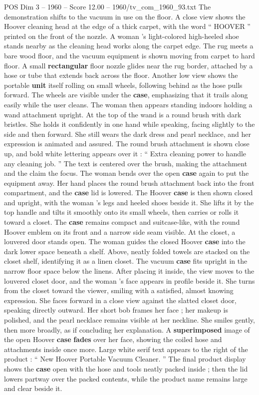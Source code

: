 \begin{textsample}{POS Dim 3 – 1960 – Score 12.00 – 1960/tv\_com\_1960\_93.txt}
The demonstration shifts to the vacuum in use on the floor.
A close view shows the Hoover cleaning head at the edge of a thick carpet, with the word “ HOOVER ” printed on the front of the nozzle.
A woman ’s light-colored high-heeled shoe stands nearby as the cleaning head works along the carpet edge.
The rug meets a bare wood floor, and the vacuum equipment is shown moving from carpet to hard floor.
A small \textbf{rectangular} floor nozzle glides near the rug border, attached by a hose or tube that extends back across the floor.
Another low view shows the portable \textbf{unit} itself rolling on small wheels, following behind as the hose pulls forward.
The wheels are visible under the \textbf{case}, emphasizing that it trails along easily while the user cleans.
The woman then appears standing indoors holding a wand attachment upright.
At the top of the wand is a round brush with dark bristles.
She holds it confidently in one hand while speaking, facing slightly to the side and then forward.
She still wears the dark dress and pearl necklace, and her expression is animated and assured.
The round brush attachment is shown close up, and bold white lettering appears over it : “ Extra cleaning power to handle any cleaning job. ” The text is centered over the brush, making the attachment and the claim the focus.
The woman bends over the open \textbf{case} again to put the equipment away.
Her hand places the round brush attachment back into the front compartment, and the \textbf{case} lid is lowered.
The Hoover \textbf{case} is then shown closed and upright, with the woman ’s legs and heeled shoes beside it.
She lifts it by the top handle and tilts it smoothly onto its small wheels, then carries or rolls it toward a closet.
The \textbf{case} remains compact and suitcase-like, with the round Hoover emblem on its front and a narrow side seam visible.
At the closet, a louvered door stands open.
The woman guides the closed Hoover \textbf{case} into the dark lower space beneath a shelf.
Above, neatly folded towels are stacked on the closet shelf, identifying it as a linen closet.
The vacuum \textbf{case} fits upright in the narrow floor space below the linens.
After placing it inside, the view moves to the louvered closet door, and the woman ’s face appears in profile beside it.
She turns from the closet toward the viewer, smiling with a satisfied, almost knowing expression.
She faces forward in a close view against the slatted closet door, speaking directly outward.
Her short bob frames her face ; her makeup is polished, and the pearl necklace remains visible at her neckline.
She smiles gently, then more broadly, as if concluding her explanation.
A \textbf{superimposed} image of the open Hoover \textbf{case} \textbf{fades} over her face, showing the coiled hose and attachments inside once more.
Large white serif text appears to the right of the product : “ New Hoover Portable Vacuum Cleaner. ” The final product display shows the \textbf{case} open with the hose and tools neatly packed inside ; then the lid lowers partway over the packed contents, while the product name remains large and clear beside it.

\end{textsample}
